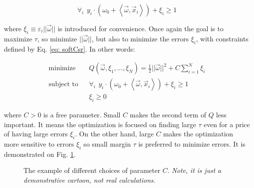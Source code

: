 \begin{equation}
  \forall_i\hspace{5pt} y_i \cdot \left(\omega_0 + \left<\vec\omega, \vec x_i\right>\right) + \xi_i\geq 1
  \label{eq: softCsr}
\end{equation}

where $\xi_i \equiv \varepsilon_i||\vec\omega||$ is introduced for convenience. Once again the goal is to maximize $\tau$, so minimize $||\vec\omega||$, but also to minimize the errors $\xi_i$, with constraints defined by Eq. \ref{eq: softCsr}. In other words:

\begin{eqnarray}
 \text{minimize} & & Q(\vec\omega, \xi_1, ... , \xi_N) = \frac{1}{2}||\vec\omega||^2 + C\sum_{i=1}^N\xi_i \\ \nonumber
 \text{subject to} & & \forall_i\hspace{5pt} y_i \cdot \left(\omega_0 + \left<\vec\omega, \vec x_i\right>\right) + \xi_i\geq 1 \\ \nonumber
 \text{} & & \xi_i \geq 0
 \label{eq: optimizationSoft}
\end{eqnarray}

where $C > 0$ is a free parameter. Small $C$ makes the second term of $Q$ less important. It means the optimization is focused on finding large $\tau$ even for a price of having large errors $\xi_i$. On the other hand, large $C$ makes the optimization more sensitive to errors $\xi_i$ so small margin $\tau$ is preferred to minimize errors. It is demonstrated on Fig. \ref{fig: svmSoftMarginC}.

\begin{figure}
\hfill
\subfigure[Large $C$]{}
\hfill
\subfigure[Small $C$]{}
\hfill
\caption{The example of different choices of parameter $C$. {\it Note, it is just a demonstrative cartoon, not real calculations.}}
\label{fig: svmSoftMarginC}
\end{figure}

